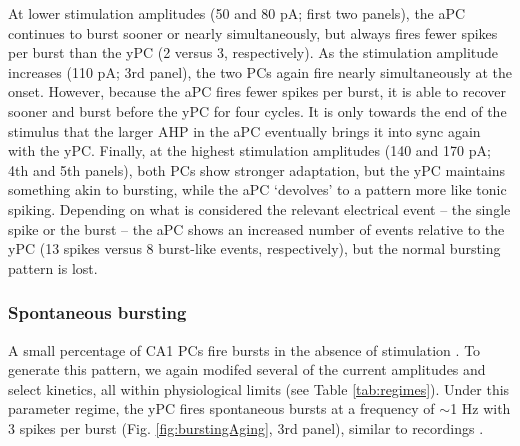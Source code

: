 \documentclass[12pt]{article}
\begin{document}
At lower stimulation amplitudes (50 and 80 pA; first two panels), the aPC continues to burst sooner or nearly simultaneously, but always fires fewer spikes per burst than the yPC (2 versus 3, respectively). As the stimulation amplitude increases (110 pA; 3rd panel), the two PCs again fire nearly simultaneously at the onset. However, because the aPC fires fewer spikes per burst, it is able to recover sooner and burst before the yPC for four cycles. It is only towards the end of the stimulus that the larger AHP in the aPC eventually brings it into sync again with the yPC. Finally, at the highest stimulation amplitudes (140 and 170 pA; 4th and 5th panels), both PCs show stronger adaptation, but the yPC maintains something akin to bursting, while the aPC `devolves' to a pattern more like tonic spiking. Depending on what is considered the relevant electrical event -- the single spike or the burst -- the aPC shows an increased number of events relative to the yPC (13 spikes versus 8 burst-like events, respectively), but the normal bursting pattern is lost. 

\subsubsection{Spontaneous bursting}
A small percentage of CA1 PCs fire bursts in the absence of stimulation \citep{jensen1994variant}. To generate this pattern, we again modifed several of the current amplitudes and select kinetics, all within physiological limits (see Table \ref{tab:regimes}). Under this parameter regime, the yPC fires spontaneous bursts at a frequency of $\sim$1 Hz with 3 spikes per burst (Fig. \ref{fig:burstingAging}, 3rd panel), similar to recordings \citep{golomb2006contribution}.
\end{document}
